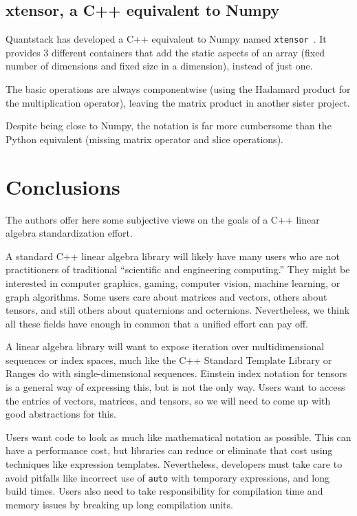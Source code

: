 \subsection{xtensor, a C++ equivalent to Numpy}
\label{S:Python:xtensor}

Quantstack has developed a C++ equivalent to Numpy named
 \texttt{xtensor}~\cite{xtensor}. It provides 3 different containers
 that add the static aspects of an array (fixed number of dimensions
 and fixed size in a dimension), instead of just one.

The basic operations are always componentwise (using the Hadamard
 product for the multiplication operator), leaving the matrix product in
 another sister project.

Despite being close to Numpy, the notation is far more cumbersome than
 the Python equivalent (missing matrix operator and slice operations).


\section{Conclusions}
\label{S:conclusions}

The authors offer here some subjective views on the goals of a C++
linear algebra standardization effort.

A standard C++ linear algebra library will likely have many users who
are not practitioners of traditional ``scientific and engineering
computing.''  They might be interested in computer graphics, gaming,
computer vision, machine learning, or graph algorithms.  Some users
care about matrices and vectors, others about tensors, and still
others about quaternions and octernions.  Nevertheless, we think all
these fields have enough in common that a unified effort can pay off.

A linear algebra library will want to expose iteration over
multidimensional sequences or index spaces, much like the C++ Standard
Template Library or Ranges do with single-dimensional sequences.
Einstein index notation for tensors is a general way of expressing
this, but is not the only way.  Users want to access the entries of
vectors, matrices, and tensors, so we will need to come up with good
abstractions for this.

Users want code to look as much like mathematical notation as
possible.  This can have a performance cost, but libraries can reduce
or eliminate that cost using techniques like expression templates.
Nevertheless, developers must take care to avoid pitfalls like
incorrect use of \texttt{auto} with temporary expressions, and long
build times.  Users also need to take responsibility for compilation
time and memory issues by breaking up long compilation units.


